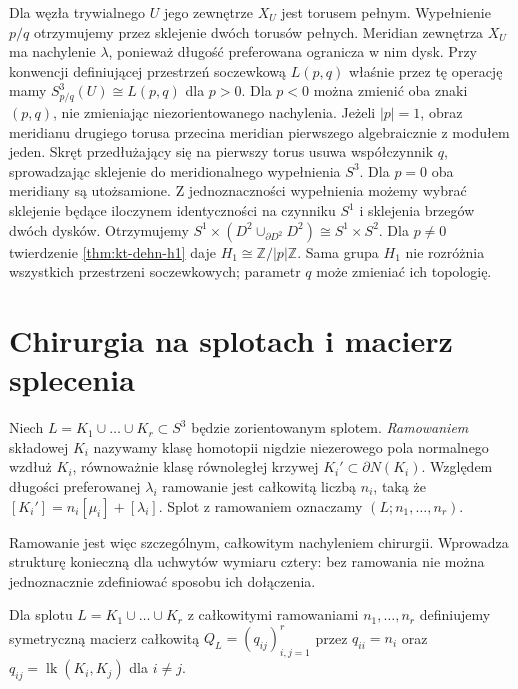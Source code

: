\begin{przyklad}
Dla węzła trywialnego $U$ jego zewnętrze $X_U$
jest torusem pełnym. Wypełnienie $p/q$ otrzymujemy
przez sklejenie dwóch torusów pełnych. Meridian
zewnętrza $X_U$ ma nachylenie $\lambda$, ponieważ
długość preferowana ogranicza w nim dysk.
Przy konwencji definiującej przestrzeń soczewkową
$L(p,q)$ właśnie przez tę operację mamy
$S^3_{p/q}(U)\cong L(p,q)$ dla $p>0$.
Dla $p<0$ można zmienić oba znaki $(p,q)$,
nie zmieniając niezorientowanego nachylenia.
Jeżeli $|p|=1$, obraz meridianu drugiego torusa
przecina meridian pierwszego algebraicznie
z modułem jeden. Skręt przedłużający się na pierwszy
torus usuwa współczynnik $q$, sprowadzając sklejenie
do meridionalnego wypełnienia $S^3$.
Dla $p=0$ oba meridiany są utożsamione.
Z jednoznaczności wypełnienia możemy wybrać
sklejenie będące iloczynem identyczności na czynniku
$S^1$ i sklejenia brzegów dwóch dysków.
Otrzymujemy $S^1\times(D^2\cup_{\partial D^2}D^2)
\cong S^1\times S^2$.
Dla $p\ne0$ twierdzenie \ref{thm:kt-dehn-h1} daje
$H_1\cong\mathbb Z/|p|\mathbb Z$.
Sama grupa $H_1$ nie rozróżnia wszystkich przestrzeni
soczewkowych; parametr $q$ może zmieniać ich topologię.
\end{przyklad}

\section{Chirurgia na splotach i macierz splecenia}
\label{sec:kt-chirurgia-link}

\begin{definicja}
Niech $L=K_1\cup\dots\cup K_r\subset S^3$ będzie
zorientowanym splotem. \emph{Ramowaniem} składowej $K_i$
nazywamy klasę homotopii nigdzie niezerowego pola normalnego
wzdłuż $K_i$, równoważnie klasę równoległej krzywej
$K_i'\subset\partial N(K_i)$. Względem długości preferowanej
$\lambda_i$ ramowanie jest całkowitą liczbą $n_i$, taką że
$[K_i']=n_i[\mu_i]+[\lambda_i]$.
Splot z ramowaniem oznaczamy $(L;n_1,\dots,n_r)$.
\end{definicja}

Ramowanie jest więc szczególnym, całkowitym nachyleniem
chirurgii. Wprowadza strukturę konieczną dla uchwytów
wymiaru cztery: bez ramowania nie można jednoznacznie
zdefiniować sposobu ich dołączenia.

\begin{definicja}
Dla splotu $L=K_1\cup\dots\cup K_r$ z całkowitymi
ramowaniami $n_1,\dots,n_r$ definiujemy symetryczną
macierz całkowitą $Q_L=(q_{ij})_{i,j=1}^r$ przez
$q_{ii}=n_i$ oraz $q_{ij}=\operatorname{lk}(K_i,K_j)$
dla $i\ne j$.
\end{definicja}


